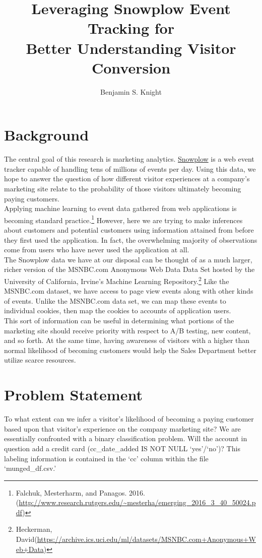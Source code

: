 \documentclass{article} %
\author{Benjamin S. Knight}
\title{%
Leveraging Snowplow Event Tracking for \\ Better Understanding Visitor Conversion}
\begin{document}
\maketitle
\vspace{-1cm}
\section{Background}
\indent\indent The central goal of this research is marketing analytics.
\href{http://snowplowanalytics.com/}{Snowplow} is a web event tracker capable of handling tens of millions of events per day. Using this data, we hope to answer the question of how different visitor experiences at a company's marketing site relate to the probability of those visitors ultimately becoming paying customers. \\
\indent Applying machine learning to event data gathered from web applications is becoming standard practice.\footnote{Falchuk, Mesterharm, and Panagos. 2016. (\url{http://www.research.rutgers.edu/~mesterha/emerging_2016_3_40_50024.pdf})} However, here we are trying to make inferences about customers and potential customers using information attained from before they first used the application. In fact, the overwhelming majority of observations come from users who have never used the application at all. \\
\indent The Snowplow data we have at our disposal can be thought of as a much larger, richer version of the MSNBC.com Anonymous Web Data Data Set hosted by the University of California, Irvine's Machine Learning Repository.\footnote{Heckerman, David(\url{https://archive.ics.uci.edu/ml/datasets/MSNBC.com+Anonymous+Web+Data})} Like the MSNBC.com dataset, we have access to page view events along with other kinds of events. Unlike the MSNBC.com data set, we can map these events to individual cookies, then map the cookies to accounts of application users. \\
\indent This sort of information can be useful in determining what portions of the marketing site should receive priority with respect to A/B testing, new content, and so forth. At the same time, having awareness of visitors with a higher than normal likelihood of becoming customers would help the Sales Department better utilize scarce resources.

\section{Problem Statement}
\indent\indent To what extent can we infer a visitor's likelihood of becoming a paying customer based upon that visitor's experience on the company marketing site? We are essentially confronted with a binary classification problem. Will the account in question add a credit card (cc\_date\_added IS NOT NULL `yes'/`no')? This labeling information is contained in the `cc' column within the file `munged\_df.csv.' 
\end{document}
